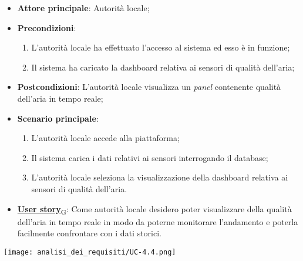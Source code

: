 \begin{itemize}
	\item \textbf{Attore principale}: Autorità locale;
	\item \textbf{Precondizioni}:
	      \begin{enumerate}
		      \item L'autorità locale ha effettuato l'accesso al sistema ed esso è in funzione;
		      \item Il sistema ha caricato la dashboard relativa ai sensori di qualità dell'aria;
	      \end{enumerate}
	\item \textbf{Postcondizioni}: L'autorità locale visualizza un \textit{panel} contenente qualità dell'aria in tempo reale;
	\item \textbf{Scenario principale}:
	      \begin{enumerate}
		      \item L'autorità locale accede alla piattaforma;
		      \item Il sistema carica i dati relativi ai sensori interrogando il database;
		      \item L'autorità locale seleziona la visualizzazione della dashboard relativa ai sensori di qualità dell'aria.
	      \end{enumerate}
	\item \href{https://7last.github.io/docs/rtb/documentazione-interna/glossario\#user-story}{\textbf{User story}\textsubscript{G}}:
	      Come autorità locale desidero poter visualizzare della qualità dell'aria in tempo reale in modo da poterne monitorare l'andamento
	      e poterla facilmente confrontare con i dati storici.
\end{itemize}
\begin{center}
	\texttt{[image: analisi\_dei\_requisiti/UC-4.4.png]}
\end{center}
